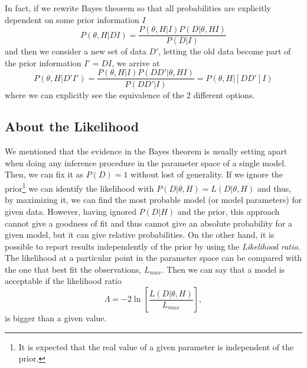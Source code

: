 \documentclass[onecolumn,           %
               showpacs,            %
               preprintnumbers,     %
               aps,                 %
               letterpaper,             %
               superscriptaddress,      %
               nofootinbib,         %
               tightenlines,        %
               floats,floatfix      %
               ,usenatbib,
               ]{revtex4-1}
\begin{document}
In fact, if we rewrite Bayes theorem so that all probabilities are explicitly dependent on some prior information $I$
\begin{equation}\label{BayesTI}
P(\theta,H|DI)=\frac{P(\theta,H|I)P(D|\theta,HI)}{P(D|I)}
\end{equation}
and then we consider a new set of data $D'$, letting the old data become part of the prior information $I'=DI$, we arrive at \cite{AlanH}   
\begin{equation}
P(\theta,H|D'I')=\frac{P(\theta,H|I)P(DD'|\theta,HI)}{P(DD'|I)}=P(\theta,H|[DD']I)
\end{equation}
where we can explicitly see the equivalence of the 2 different options. 
\subsection{About the Likelihood}

We mentioned that the evidence in the Bayes theorem is usually setting apart when doing any inference procedure in the parameter space of a single model. Then, we can fix it as $P(D)=1$ without lost of generality. If we ignore the prior\footnote{It is expected that the real value of a given parameter is independent of the prior.} we can identify the likelihood with $P(D|\theta, H)=L(D|\theta, H)$ and thus, by maximizing it, we can find the most probable model (or model parameters) for given data. However, having ignored $P(D|H)$ and the prior, this approach cannot give a goodness of fit and thus cannot give an absolute probability for a given model, but it can give relative probabilities. On the other hand, it is possible to report results independently of the prior by using the \textit{Likelihood ratio}. The likelihood at a particular point in the parameter space can be compared with the one that best fit the observations, $L_{max}$. Then we can say that a model is acceptable if the likelihood ratio
\begin{equation}
\Lambda=-2\ln\left[\frac{L(D|\theta, H)}{L_{max}}\right],
\end{equation}
is bigger than a given value.
\end{document}
